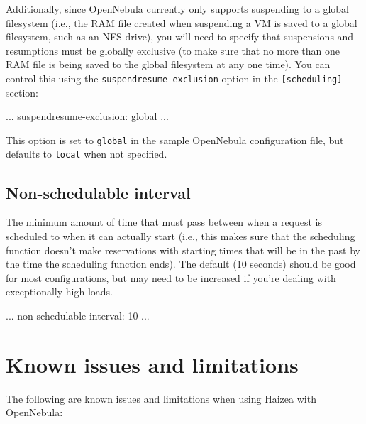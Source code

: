 Additionally, since OpenNebula currently only supports suspending to a global filesystem (i.e., the RAM file created when suspending a VM is saved to a global filesystem, such as an NFS drive), you will need to specify that suspensions and resumptions must be globally exclusive (to make sure that no more than one RAM file is being saved to the global filesystem at any one time). You can control this using the \texttt{suspendresume-exclusion} option in the \texttt{[scheduling]} section:

\begin{wideshellverbatim}
[scheduling]
...
suspendresume-exclusion: global
...
\end{wideshellverbatim}

This option is set to \texttt{global} in the sample OpenNebula configuration file, but defaults to \texttt{local} when not specified.

\subsection{Non-schedulable interval}

The minimum amount of time that must pass between when a request is scheduled to when it can actually start (i.e., this makes sure that the scheduling function doesn't make reservations with starting times that will be in the past by the time the scheduling function ends). The default (10 seconds) should be good for most configurations, but may need to be increased if you're dealing with exceptionally high loads.

\begin{wideshellverbatim}
[opennebula]
...
non-schedulable-interval: 10
...
\end{wideshellverbatim}

\section{Known issues and limitations}

The following are known issues and limitations when using Haizea with OpenNebula:

